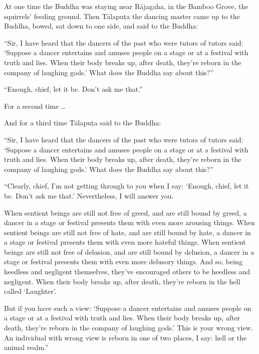 \documentclass[12pt,openany]{book}%
\begin{document}
At one time the Buddha was staying near \textsanskrit{Rājagaha}, in the Bamboo Grove, the squirrels’ feeding ground. Then \textsanskrit{Tālapuṭa} the dancing master came up to the Buddha, bowed, sat down to one side, and said to the Buddha: 

“Sir, I have heard that the dancers of the past who were tutors of tutors said: ‘Suppose a dancer entertains and amuses people on a stage or at a festival with truth and lies. When their body breaks up, after death, they’re reborn in the company of laughing gods.’ What does the Buddha say about this?” 

“Enough, chief, let it be. Don’t ask me that.” 

For a second time … 

And for a third time \textsanskrit{Tālapuṭa} said to the Buddha: 

“Sir, I have heard that the dancers of the past who were tutors of tutors said: ‘Suppose a dancer entertains and amuses people on a stage or at a festival with truth and lies. When their body breaks up, after death, they’re reborn in the company of laughing gods.’ What does the Buddha say about this?” 

“Clearly, chief, I’m not getting through to you when I say: ‘Enough, chief, let it be. Don’t ask me that.’ Nevertheless, I will answer you. 

When sentient beings are still not free of greed, and are still bound by greed, a dancer in a stage or festival presents them with even more arousing things. When sentient beings are still not free of hate, and are still bound by hate, a dancer in a stage or festival presents them with even more hateful things. When sentient beings are still not free of delusion, and are still bound by delusion, a dancer in a stage or festival presents them with even more delusory things. And so, being heedless and negligent themselves, they’ve encouraged others to be heedless and negligent. When their body breaks up, after death, they’re reborn in the hell called ‘Laughter’. 

But if you have such a view: ‘Suppose a dancer entertains and amuses people on a stage or at a festival with truth and lies. When their body breaks up, after death, they’re reborn in the company of laughing gods.’ This is your wrong view. An individual with wrong view is reborn in one of two places, I say: hell or the animal realm.” 
\end{document}
